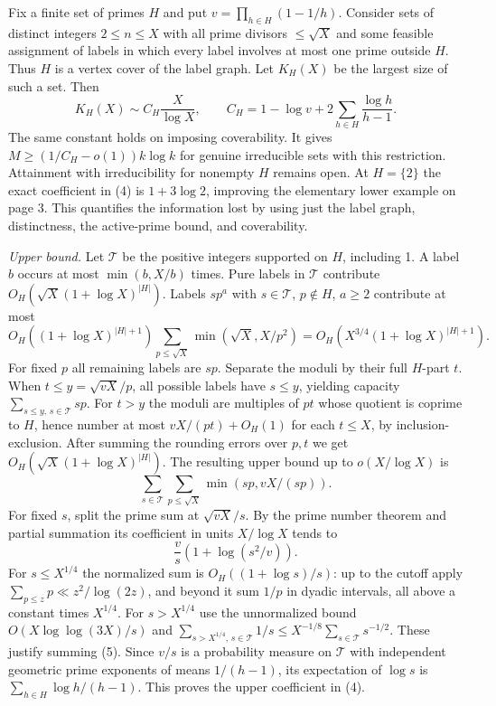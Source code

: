 \newpage
{}
Fix a finite set of primes $H$ and put $v=\prod_{h\in H}(1-1/h)$. Consider sets of distinct integers $2\le n\le X$ with all prime divisors $\le\sqrt X$ and some feasible assignment of labels in which every label involves at most one prime outside $H$. Thus $H$ is a vertex cover of the label graph. Let $K_H(X)$ be the largest size of such a set. Then
\[
 K_H(X)\sim C_H\frac X{\log X},\qquad
 C_H=1-\log v+2\sum_{h\in H}\frac{\log h}{h-1}.\tag{4}
\]
The same constant holds on imposing coverability. It gives $M\ge(1/C_H-o(1))k\log k$ for genuine irreducible sets with this restriction. Attainment with irreducibility for nonempty $H$ remains open. At $H=\{2\}$ the exact coefficient in (4) is $1+3\log 2$, improving the elementary lower example on page 3. This quantifies the information lost by using just the label graph, distinctness, the active-prime bound, and coverability.

\emph{Upper bound.} Let $\mathcal T$ be the positive integers supported on $H$, including 1. A label $b$ occurs at most $\min(b,X/b)$ times. Pure labels in $\mathcal T$ contribute $O_H(\sqrt X(1+\log X)^{|H|})$. Labels $s p^a$ with $s\in\mathcal T$, $p\notin H$, $a\ge2$ contribute at most
\[
 O_H((1+\log X)^{|H|+1})\sum_{p\le\sqrt X}\min(\sqrt X,X/p^2)
 = O_H(X^{3/4}(1+\log X)^{|H|+1}).
\]
For fixed $p$ all remaining labels are $s p$. Separate the moduli by their full $H$-part $t$. When $t\le y=\sqrt{v X}/p$, all possible labels have $s\le y$, yielding capacity $\sum_{s\le y,\,s\in\mathcal T}sp$. For $t>y$ the moduli are multiples of $pt$ whose quotient is coprime to $H$, hence number at most $vX/(pt)+O_H(1)$ for each $t\le X$, by inclusion-exclusion. After summing the rounding errors over $p,t$ we get $O_H(\sqrt X(1+\log X)^{|H|})$. The resulting upper bound up to $o(X/\log X)$ is
\[
 \sum_{s\in\mathcal T}\sum_{p\le\sqrt X}\min(sp,vX/(sp)).
\]
For fixed $s$, split the prime sum at $\sqrt{vX}/s$. By the prime number theorem and partial summation its coefficient in units $X/\log X$ tends to
\[
 \frac vs\left(1+\log(s^2/v)\right).\tag{5}
\]
For $s\le X^{1/4}$ the normalized sum is $O_H((1+\log s)/s)$: up to the cutoff apply $\sum_{p\le z}p\ll z^2/\log(2z)$, and beyond it sum $1/p$ in dyadic intervals, all above a constant times $X^{1/4}$. For $s>X^{1/4}$ use the unnormalized bound $O(X\log\log(3X)/s)$ and $\sum_{s>X^{1/4},\,s\in\mathcal T}1/s\le X^{-1/8}\sum_{s\in\mathcal T}s^{-1/2}$. These justify summing (5). Since $v/s$ is a probability measure on $\mathcal T$ with independent geometric prime exponents of means $1/(h-1)$, its expectation of $\log s$ is $\sum_{h\in H}\log h/(h-1)$. This proves the upper coefficient in (4).

